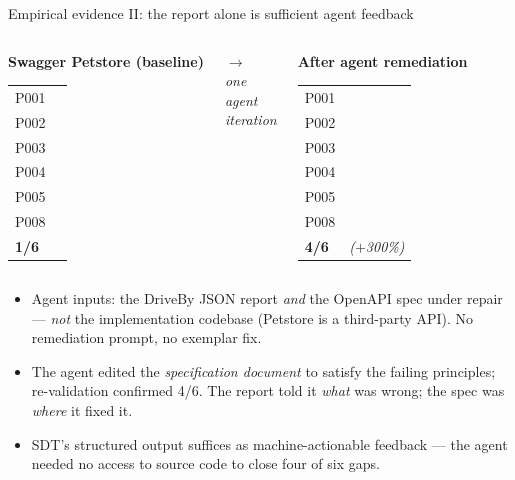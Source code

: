 \documentclass[11pt,aspectratio=169]{beamer}
\newcommand{\cmark}{\textcolor{green!60!black}{\ding{51}}}
\newcommand{\xmark}{\textcolor{red!70!black}{\ding{55}}}
\begin{document}
\begin{frame}{Empirical evidence II: the report alone is sufficient agent feedback}

\begin{columns}[c,onlytextwidth]

\begin{center}
\textbf{Swagger Petstore (baseline)}\\[0.6em]
\footnotesize
\begin{tabular}{ll}
P001 & \cmark \\
P002 & \xmark \\
P003 & \xmark \\
P004 & \xmark \\
P005 & \xmark \\
P008 & \xmark \\
\hline
\textbf{1/6} & \\
\end{tabular}
\end{center}

\begin{center}
\Large $\longrightarrow$\\[0.4em]
\scriptsize\itshape one\\agent\\iteration
\end{center}

\begin{center}
\textbf{After agent remediation}\\[0.6em]
\footnotesize
\begin{tabular}{ll}
P001 & \cmark \\
P002 & \cmark \\
P003 & \cmark \\
P004 & \cmark \\
P005 & \xmark \\
P008 & \xmark \\
\hline
\textbf{4/6} & \footnotesize\itshape ($+$300\%) \\
\end{tabular}
\end{center}

\end{columns}

\vspace{0.6em}
\footnotesize
\begin{itemize}\setlength\itemsep{0.2em}
\item Agent inputs: the DriveBy JSON report \emph{and} the OpenAPI spec under repair
  --- \emph{not} the implementation codebase (Petstore is a third-party API). No
  remediation prompt, no exemplar fix.
\item The agent edited the \emph{specification document} to satisfy the failing
  principles; re-validation confirmed 4/6. The report told it \emph{what} was wrong;
  the spec was \emph{where} it fixed it.
\item \alert{SDT's structured output suffices as machine-actionable feedback}
  --- the agent needed no access to source code to close four of six gaps.
\end{itemize}


\end{frame}
\end{document}
